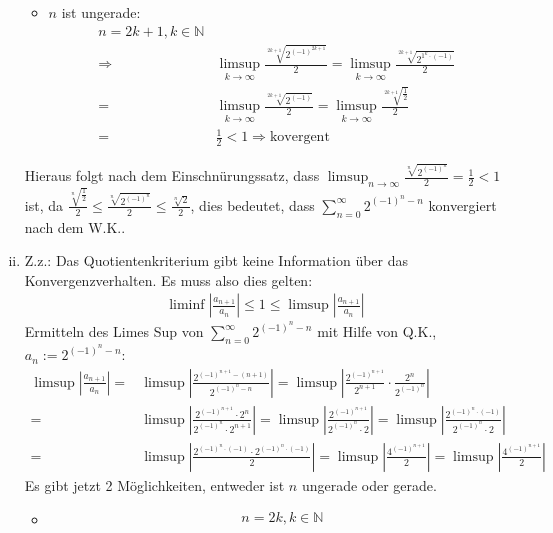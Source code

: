 \documentclass{scrartcl}
\begin{document}
\begin{enumerate}[(i)]
\begin{itemize}
				\item $n$ ist ungerade:
						\begin{align*}
							n = 2k+1 ,k \in \mathbb{N} \\
							\Rightarrow &\limsup_{k \to \infty}\frac{\sqrt[2k+1]{2^{(-1)^{2k+1}}}}{2} = \limsup_{k \to \infty}\frac{\sqrt[2k+1]{2^{1^k \cdot (-1)}}}{2} \\
							= &\limsup_{k \to \infty}\frac{\sqrt[2k+1]{2^{(-1)}}}{2} = \limsup_{k \to \infty}\frac{\sqrt[2k+1]{\frac{1}{2}}}{2} \\
							= &\frac{1}{2} < 1 \Rightarrow \text{kovergent}
						\end{align*}
				\end{itemize}
				Hieraus folgt nach dem Einschnürungssatz, dass $\limsup_{n \to \infty}\frac{\sqrt[n]{2^{(-1)^n}}}{2} = \frac{1}{2} < 1$ ist, da $\frac{\sqrt[n]{\frac{1}{2}}}{2} \leq \frac{\sqrt[n]{2^{(-1)^n}}}{2} \leq \frac{\sqrt[n]{2}}{2}$, dies bedeutet, dass $\sum^{\infty}_{n=0} 2^{(-1)^n - n}$ konvergiert nach dem W.K..
		\item Z.z.: Das Quotientenkriterium gibt keine Information über das Konvergenzverhalten. Es muss also dies gelten:
				\begin{align*}
					\liminf\left|\frac{a_{n+1}}{a_n}\right|\leq 1 \leq \limsup\left|\frac{a_{n+1}}{a_n}\right|
				\end{align*}
				Ermitteln des Limes Sup von $\sum^{\infty}_{n=0} 2^{(-1)^n - n}$ mit Hilfe von Q.K., $a_n:=2^{(-1)^n - n}$:
				\begin{align*}
					\limsup\left|\frac{a_{n+1}}{a_n}\right| = &\limsup\left|\frac{2^{(-1)^{n+1}-(n+1)}}{2^{(-1)^n - n}}\right| = \limsup\left|\frac{2^{(-1)^{n+1}}}{2^{n+1}}\cdot \frac{2^n}{2^{(-1)^n}}\right| \\
					=& \limsup\left|\frac{2^{(-1)^{n+1}}\cdot 2^n}{2^{(-1)^n}\cdot 2^{n+1}}\right| = \limsup\left|\frac{2^{(-1)^{n+1}}}{2^{(-1)^n}\cdot 2}\right| = \limsup\left|\frac{2^{(-1)^n \cdot (-1)}}{2^{(-1)^n}\cdot 2}\right| \\
					=& \limsup\left|\frac{2^{(-1)^n \cdot (-1)}\cdot 2^{(-1)^n \cdot (-1)}}{2}\right| = \limsup\left|\frac{4^{(-1)^{n+1}}}{2}\right| = \limsup\left|\frac{4^{(-1)^{n+1}}}{2}\right|
				\end{align*}
				Es gibt jetzt 2 Möglichkeiten, entweder ist $n$ ungerade oder gerade.
				\begin{itemize}
					\item 	\begin{align*}
								&n = 2k ,k \in \mathbb{N} \\

\end{align*}
\end{itemize}
\end{enumerate}
\end{document}
